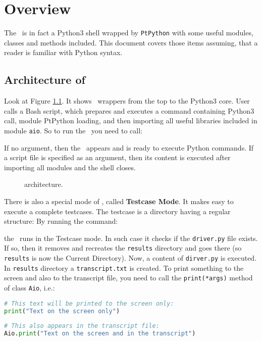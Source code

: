 \chapter{Overview}

The \ShellName\ is in fact a Python3 shell wrapped by \texttt{PtPython} with some useful modules, classes and methods included. This document covers those items assuming, that a reader is familiar with Python syntax.

\section{Architecture of \ShellName}

Look at Figure \ref{aioarchitecture}. It shows \ShellName\ wrappers from the top to the Python3 core. User calls a Bash script, which prepares and executes a command containing Python3 call, module PtPython loading, and then importing all useful libraries included in module \texttt{aio}. So to run the \ShellName\ you need to call:
\begin{alltt}
\end{alltt}
If no argument, then the \ShellName\ appears and is ready to execute Python commands. If a script file is specified as an argument, then its content is executed after importing all modules and the shell closes. 

\begin{figure}[h]
	\centering
	
	\caption{\ShellName architecture.}
	\label{aioarchitecture}
\end{figure}

There is also a special mode of \ShellName, called \textbf{Testcase Mode}. It makes easy to execute a complete testcases. The testcase is a directory having a regular structure:
By running the command:
\begin{alltt}
	\daio
\end{alltt}
the \ShellName\ runs in the Testcase mode. In such case it checks if the \texttt{driver.py} file exists. If so, then it removes and recreates the \texttt{results} directory and goes there (so \texttt{results} is now the Current Directory). Now, a content of \texttt{dirver.py} is executed. In \texttt{results} directory a \texttt{transcript.txt} is created. To print something to the screen and also to the transcript file, you need to call the \texttt{print(*args)} method of class \texttt{Aio}, i.e.:
\begin{lstlisting}[language=Python]
# This text will be printed to the screen only:
print("Text on the screen only")
	
# This also appears in the transcript file:
Aio.print("Text on the screen and in the transcript")
\end{lstlisting} 

